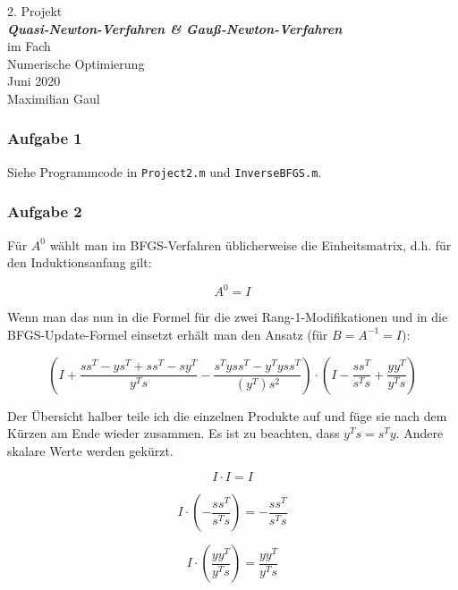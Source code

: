 \documentclass[a4paper, 12pt]{report}
\begin{document}
\begin{center}
    \vspace*{2em}
    \normalsize 2. Projekt\\
    \vspace*{1em}
    \normalsize \textbf{\textit{Quasi-Newton-Verfahren \& Gauß-Newton-Verfahren}}\\
    \vspace*{4em}
    \normalsize im Fach\\
    \vspace*{1em}
    \large Numerische Optimierung\\
    \vspace*{30em}
    \normalsize Juni 2020\\
    \vspace*{1em}
    \normalsize Maximilian Gaul
\end{center}

\thispagestyle{empty}

\newpage

\subsubsection{Aufgabe 1}
Siehe Programmcode in \lstinline[basicstyle=\ttfamily\color{black}]|Project2.m| und \lstinline[basicstyle=\ttfamily\color{black}]|InverseBFGS.m|.

\subsubsection{Aufgabe 2}
Für $A^0$ wählt man im BFGS-Verfahren üblicherweise die Einheitsmatrix, d.h. für den Induktionsanfang gilt:

$$A^0 = I$$

Wenn man das nun in die Formel für die zwei Rang-1-Modifikationen und in die BFGS-Update-Formel einsetzt erhält man den Ansatz
(für $B = A^{-1} = I$):

$$\left( I + \frac{ss^T - ys^T + ss^T - sy^T}{y^Ts} - \frac{s^Tyss^T - y^Tyss^T}{(y^T)s^2}\right)\cdot\left(I - \frac{ss^T}{s^Ts} + \frac{yy^T}{y^Ts} \right)$$

Der Übersicht halber teile ich die einzelnen Produkte auf und füge sie nach dem Kürzen am Ende wieder zusammen.
Es ist zu beachten, dass $y^Ts = s^Ty$. Andere skalare Werte werden gekürzt.

$$I\cdot I = I$$

$$I \cdot \left(-\frac{ss^T}{s^Ts}\right) = -\frac{ss^T}{s^Ts}$$

$$I\cdot \left(\frac{yy^T}{y^Ts}\right) = \frac{yy^T}{y^Ts}$$
\end{document}
